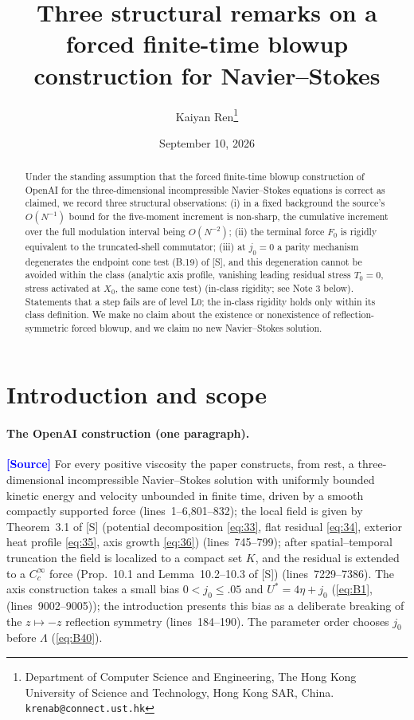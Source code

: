 \documentclass[11pt,a4paper]{article}
\title{Three structural remarks on a forced finite-time blowup construction for Navier--Stokes}
\author{Kaiyan Ren\thanks{Department of Computer Science and Engineering,
The Hong Kong University of Science and Technology, Hong Kong SAR, China.
\texttt{krenab@connect.ust.hk}}}
\date{September 10, 2026}
\theoremstyle{definition}
\theoremstyle{remark}
\newcommand{\lnos}[1]{(lines~#1)}
\newcommand{\ORIG}{\textcolor{blue}{\textbf{[Source]}}}
\begin{document}
\maketitle

\begin{abstract}
Under the standing assumption that the forced finite-time blowup construction of \mbox{OpenAI} for the
three-dimensional incompressible Navier--Stokes equations is correct as claimed, we record three
structural observations:
(i) in a fixed background the source's $O(N^{-1})$ bound for the five-moment increment is non-sharp,
the cumulative increment over the full modulation interval being $O(N^{-2})$;
(ii) the terminal force $F_0$ is rigidly equivalent to the truncated-shell commutator;
(iii) at $j_0=0$ a parity mechanism degenerates the endpoint cone test (B.19) of [S], and this
degeneration cannot be avoided within the class (analytic axis profile, vanishing leading residual stress
$T_0=0$, stress activated at $X_0$, the same cone test) (in-class rigidity; see Note 3 below).
Statements that a step fails are of level L0; the in-class rigidity holds only within its class
definition. We make no claim about the existence or nonexistence of reflection-symmetric forced blowup,
and we claim no new Navier--Stokes solution.
\end{abstract}

\tableofcontents

\section{Introduction and scope}
\label{sec:intro}

\paragraph{The OpenAI construction (one paragraph).}
\ORIG
For every positive viscosity the paper constructs, from rest, a three-dimensional incompressible
Navier--Stokes solution with uniformly bounded kinetic energy and velocity unbounded in finite time,
driven by a smooth compactly supported force
\lnos{1--6,801--832}; the local field is given by Theorem~3.1 of [S]
(potential decomposition \eqref{eq:33}, flat residual \eqref{eq:34}, exterior heat profile \eqref{eq:35},
axis growth \eqref{eq:36})
\lnos{745--799};
after spatial--temporal truncation the field is localized to a compact set $K$, and the residual is
extended to a $C^\infty_c$ force (Prop.~10.1 and Lemma~10.2--10.3 of [S]) \lnos{7229--7386}.
The axis construction takes a small bias $0<j_0\le .05$ and $U^*=4\eta+j_0$
(\eqref{eq:B1}, \lnos{9002--9005});
the introduction presents this bias as a deliberate breaking of the $z\mapsto -z$ reflection symmetry
\lnos{184--190}.
The parameter order chooses $j_0$ before $\Lambda$ (\eqref{eq:B40}).
\end{document}
